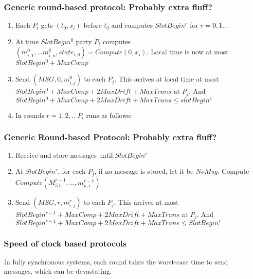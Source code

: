         \begin{frame}
            \frametitle{Generic round-based protocol: Probably extra fluff?}
                \begin{enumerate}
                    \item Each $P_i$ gets $(t_0, x_i)$ before $t_0$ and computes $SlotBegin^r$ for $r = 0, 1...$
                    \item At time $SlotBegin^0$ party $P_i$ computes $(m_{i, 1}^0, ...m_{i, n}^0, state_{i, 0}) = Compute(0, x_i)$. Local time is 
                    now at most $SlotBegin^0 + MaxComp$
                    \item Send $(MSG, 0, m_{i, j}^0)$ to each $P_j$. This arrives at local time at most $SlotBegin^0 + MaxComp + 2MaxDrift + MaxTrans$ at $P_j$. And $SlotBegin^0 + MaxComp + 2MaxDrift + MaxTrans \leq slotBegin^1$
                    \item In rounds $r = 1, 2, ..$ $P_i$ runs as follows:
                \end{enumerate}
        \end{frame}
        \begin{frame}
            \frametitle{Generic Round-based Protocol: Probably extra fluff?}
                \begin{enumerate}
                    \item Receive and store messages until $SlotBegin^r$
                    \item At $SlotBegin^r$, for each $P_j$, if no message is stored, let it be $NoMsg$. Compute $Compute(M_{i, i}^{r-1}, ..., m_{n, i}^{r - 1})$ 
                    \item Send $(MSG, r, m_{i, j}^r)$ to each $P_j$. This arrives at most $SlotBegin^{r-1} + MaxComp + 2MaxDrift + MaxTrans$ at $P_j$. And $SlotBegin^{r-1} + MaxComp + 2MaxDrift + MaxTrans \leq SlotBegin^r$
                \end{enumerate}
        \end{frame}

    \begin{frame}
        \frametitle{Speed of clock based protocols}
            In fully synchronous systems, each round takes the worst-case time to send messages, which can be devastating. 
    \end{frame}        



